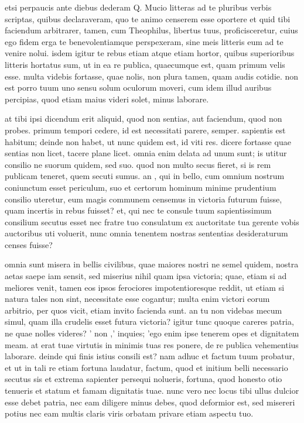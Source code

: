 


 etsi perpaucis ante diebus dederam Q. Mucio litteras ad te pluribus verbis scriptas, quibus declaraveram, quo te animo censerem esse oportere et quid tibi faciendum arbitrarer, tamen, cum Theophilus, libertus tuus, proficisceretur, cuius ego fidem erga te benevolentiamque perspexeram, sine meis litteris eum ad te venire nolui. isdem igitur te rebus etiam atque etiam hortor, quibus superioribus litteris hortatus sum, ut in ea re publica, quaecumque est, quam primum velis esse. multa videbis fortasse, quae nolis, non plura tamen, quam audis cotidie. non est porro tuum uno sensu solum oculorum moveri, cum idem illud auribus percipias, quod etiam maius videri solet, minus laborare.

 at tibi ipsi dicendum erit aliquid, quod non sentias, aut faciendum, quod non probes. primum tempori cedere, id est necessitati parere, semper. sapientis est habitum; deinde non habet, ut nunc quidem est, id viti res. dicere fortasse quae sentias non licet, tacere plane licet. omnia enim delata ad unum sunt; is utitur consilio ne suorum quidem, sed suo. quod non multo secus fieret, si is rem publicam teneret, quem secuti sumus. an , qui in bello, cum omnium nostrum coniunctum esset periculum, suo et certorum hominum minime prudentium consilio uteretur, eum magis communem censemus in victoria futurum fuisse, quam incertis in rebus fuisset? et, qui nec te consule tuum sapientissimum consilium secutus esset nec fratre tuo consulatum ex auctoritate tua gerente vobis auctoribus uti voluerit, nunc omnia tenentem nostras sententias desideraturum censes fuisse?

 omnia sunt misera in bellis civilibus, quae maiores nostri ne semel quidem, nostra aetas saepe iam sensit, sed miserius nihil quam ipsa victoria; quae, etiam si ad meliores venit, tamen eos ipsos ferociores impotentioresque reddit, ut etiam si natura tales non sint, necessitate esse cogantur; multa enim victori eorum arbitrio, per quos vicit, etiam invito facienda sunt. an tu non videbas mecum simul, quam illa crudelis esset futura victoria? igitur tunc quoque careres patria, ne quae nolles videres? ' non ,' inquies; 'ego enim ipse tenerem opes et dignitatem meam. at erat tuae virtutis in minimis tuas res ponere, de re publica vehementius laborare. deinde qui finis istius consili est? nam adhuc et factum tuum probatur, et ut in tali re etiam fortuna laudatur, factum, quod et initium belli necessario secutus sis et extrema sapienter persequi nolueris, fortuna, quod honesto otio tenueris et statum et famam dignitatis tuae. nunc vero nec locus tibi ullus dulcior esse debet patria, nec eam diligere minus debes, quod deformior est, sed misereri potius nec eam multis claris viris orbatam privare etiam aspectu tuo.

